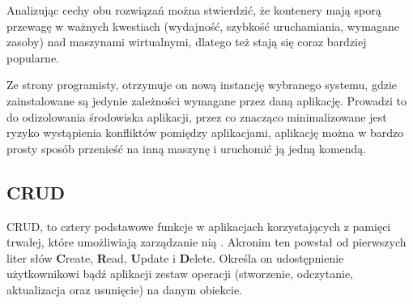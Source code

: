 Analizując cechy obu rozwiązań można stwierdzić, że kontenery mają sporą przewagę w ważnych kwestiach (wydajność, szybkość uruchamiania, wymagane zasoby) nad maszynami wirtualnymi, dlatego też stają się coraz bardziej popularne.

Ze strony programisty, otrzymuje on nową instancję wybranego systemu, gdzie zainstalowane są jedynie zależności wymagane przez daną aplikację. Prowadzi to do odizolowania środowiska aplikacji, przez co znacząco minimalizowane jest ryzyko wystąpienia konfliktów pomiędzy aplikacjami, aplikację można w bardzo prosty sposób przenieść na inną maszynę i uruchomić ją jedną komendą.

\subsection{CRUD}
CRUD, to cztery podstawowe funkcje w aplikacjach korzystających z pamięci trwałej, które umożliwiają zarządzanie nią \cite{wiki_crud}. Akronim ten powstał od pierwszych liter słów \textbf{C}reate, \textbf{R}ead, \textbf{U}pdate i \textbf{D}elete. Określa on udostępnienie użytkownikowi bądź aplikacji zestaw operacji (stworzenie, odczytanie, aktualizacja oraz usunięcie) na danym obiekcie.
